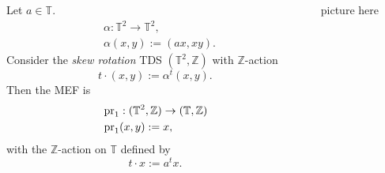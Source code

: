 \begin{frame}
  \begin{columns}
    \begin{column}{0.5\textwidth}
  \begin{example}
Let $a \in \mathbb{T}$.
\begin{equation*}
  \begin{split}
    &\alpha: \mathbb{T}^2 \to \mathbb{T}^2,\\
  &\alpha (x,y) := (ax,xy).
  \end{split}
  \end{equation*}
     Consider the \emph{skew rotation} TDS $(\mathbb{T}^2,\mathbb{Z})$ with $\mathbb{Z}$-action
     \begin{equation*}
     t \cdot (x,y) := \alpha^t (x,y).
     \end{equation*}
     \pause
  Then the MEF is 
  \begin{equation*}
    \begin{split}
     &\operatorname{pr}_1 : (\mathbb{T}^2,\mathbb{Z}) \to (\mathbb{T},\mathbb{Z}) \\
    &\operatorname{pr}_1 (x,y) := x,
    \end{split}
  \end{equation*}
  with the $\mathbb{Z}$-action on $\mathbb{T}$ defined by
  \begin{equation*}
   t\cdot  x := a^t x.
  \end{equation*}
\end{example}
    \end{column}
    \begin{column}{0.5\textwidth}
      picture here 
    \end{column}
  \end{columns}
\end{frame}

